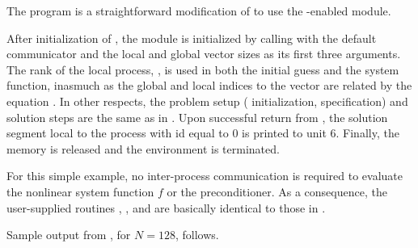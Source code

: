 The program  is a straightforward modification of 
 to use the {\mpi}-enabled {\nvecp} module.

After initialization of {\mpi}, the {\nvecp} module is initialized by calling
 with the default {\mpi} communicator  and
the local and global vector sizes as its first three arguments.
The rank of the local process, , is used in both the initial guess
and the system function, inasmuch as the global and local indices to
the vector  are related by the equation .
In other respects, the problem setup ({\kinsol} initialization,
{\sunlinsolspgmr} specification) and solution steps are the same as in
.  Upon successful return from , the
solution segment local to the process with id equal to $0$ is printed
to unit 6. Finally, the {\kinsol} memory is released and the {\mpi}
environment is terminated. 

For this simple example, no inter-process communication is required to
evaluate the nonlinear system function $f$ or the preconditioner. 
As a consequence, the user-supplied routines , , and
 are basically identical to those in .

Sample output from , for $N=128$, follows.

